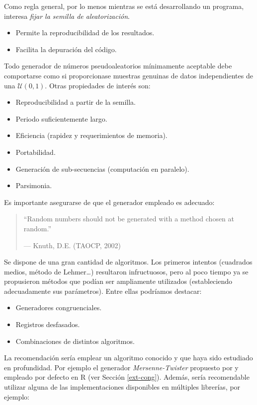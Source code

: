 \documentclass[
  spanish,
  10pt,
]{book}
\theoremstyle{break}
\theoremstyle{nonumberplain}
\begin{document}
Como regla general, por lo menos mientras se está desarrollando un
programa, interesa \emph{fijar la semilla de aleatorización}.

\begin{itemize}
\item
  Permite la reproducibilidad de los resultados.
\item
  Facilita la depuración del código.
\end{itemize}

Todo generador de números pseudoaleatorios mínimamente aceptable debe comportarse como si proporcionase muestras genuinas de datos independientes de una \(\mathcal{U}(0,1)\).
Otras propiedades de interés son:

\begin{itemize}
\item
  Reproducibilidad a partir de la semilla.
\item
  Periodo suficientemente largo.
\item
  Eficiencia (rapidez y requerimientos de memoria).
\item
  Portabilidad.
\item
  Generación de sub-secuencias (computación en paralelo).
\item
  Parsimonia.
\end{itemize}

Es importante asegurarse de que el generador empleado es adecuado:

\begin{quote}
``Random numbers should not be generated with a method chosen at random.''

--- Knuth, D.E. (TAOCP, 2002)
\end{quote}

Se dispone de una gran cantidad de algoritmos.
Los primeros intentos (cuadrados medios, método de Lehmer\ldots) resultaron infructuosos, pero al poco tiempo ya se propusieron métodos que podían ser ampliamente utilizados (estableciendo adecuadamente sus parámetros).
Entre ellas podríamos destacar:

\begin{itemize}
\item
  Generadores congruenciales.
\item
  Registros desfasados.
\item
  Combinaciones de distintos algoritmos.
\end{itemize}

La recomendación sería emplear un algoritmo conocido y que haya sido estudiado en profundidad.
Por ejemplo el generador \emph{Mersenne-Twister} propuesto por \citet{matsumoto1998} y empleado por defecto en R (ver Sección \ref{ext-cong}).
Además, sería recomendable utilizar alguna de las implementaciones disponibles en múltiples librerías, por ejemplo:
\end{document}
